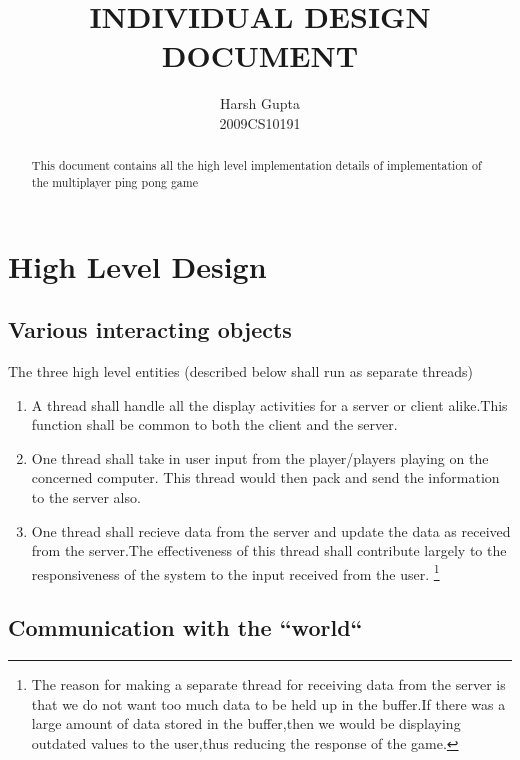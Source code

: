 \documentclass[11pt]{article}
\title{INDIVIDUAL DESIGN DOCUMENT}
\author{Harsh Gupta\\2009CS10191}
\begin{document}
\maketitle

\begin{abstract}
This document contains all the high level implementation details of implementation of the multiplayer ping pong game
\end{abstract}

\pagebreak

\section{High Level Design}
\subsection{Various interacting objects}
The three high level entities (described below shall run as separate threads)
\begin{enumerate}
 \item A thread shall handle all the display activities for a server or client alike.This function shall be common to both the client and the server.
\item One thread shall take in user input from the player/players playing on the concerned computer. This thread would then pack and send the information to the server also. 
\item One thread shall recieve data from the server and update the data as received from the server.The effectiveness of this thread shall contribute largely to the responsiveness of the system to the input received from the user.
\footnote{The reason for making a separate thread for receiving data from the server is that we do not want too much data to be held up in the buffer.If there was a large amount of data stored in the buffer,then we would be displaying outdated values to the user,thus reducing the response of the game.}
\end{enumerate}
\subsection{Communication with the ``world``}
\end{document}
